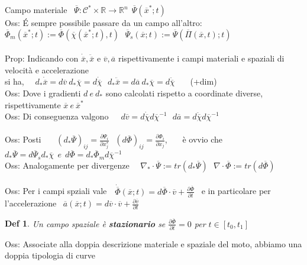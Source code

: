 \documentclass{article}
\theoremstyle{unnumbered}
\newtheorem* {theoremT}{Def}
\theoremstyle{unnumbered1}
\newenvironment{defi}{\begin{gBox}\begin{theoremT}}{\end{theoremT}\end{gBox}}
\begin{document}
Campo materiale \ $\overline{\Psi}:\mathcal{C}^*\times\mathbb{R}\rightarrow\mathbb{R}^n \ \ \overline{\Psi}(\overline{x}^*;t)$\\
%
%
%
Oss: É sempre possibile passare da un campo all'altro:\ \ $\overline{\Phi}_m(\overline{x}^*;t):= \overline{\Phi}(\overline{\chi}(\overline{x}^*;t),t) \ \ \ \overline{\Psi}_s(\overline{x};t):= \overline{\Psi}(\overline{\Pi}(\overline{x},t);t)$\\ \\
%
%
%
Prop: Indicando con $\dot{\overline{x}}, \ddot{\overline{x}}$ e $\overline{v},\overline{a}$ rispettivamente i campi materiali e spaziali di velocità e accelerazione\\
\phantom{Prop: }si ha, \ \ $d_*\dot{\overline{x}}=d\overline{v}\ d_*\overline{\chi}= d\dot{\overline{\chi}} \ \ \ d_*\ddot{\overline{x}}=d\overline{a}\ d_*\overline{\chi}= d\ddot{\overline{\chi}}$ \ \ \ (+dim)\\
%
Oss: Dove i gradienti $d \ e \ d_*$ sono calcolati rispetto a coordinate diverse, rispettivamente $\overline{x} \ e \ \overline{x}^*$ \\
%
Oss: Di conseguenza valgono\ \ \ $d\overline{v}=d\dot{\overline{\chi}}d\overline{\chi}^{-1} \ \ \ d\overline{a}=d\ddot{\overline{\chi}}d\overline{\chi}^{-1}$\\ \\
%
%
%
Oss: Posti \ \ \ $(d_*\overline{\Psi})_{ij}=\frac{\partial \Psi_i}{\partial x^*_j} \ \ \ (d\overline{\Phi})_{ij}=\frac{\partial \Phi_i}{\partial x_j}$, \ \ \ è ovvio che \ $d_*\overline{\Psi}=d\overline{\Psi}_sd_*\overline{\chi} \ \ e \ \ d\overline{\Phi}=d_*\overline{\Phi}_md\overline{\chi}^{-1}$ \\
%
%
Oss: Analogamente per divergenze \ \ $\nabla_*\cdot\overline{\Psi}:=tr(d_*\overline{\Psi}) \ \ \ \nabla\cdot\overline{\Phi}:=tr(d\overline{\Phi}) $\\ \\
%
%
%
Oss: Per i campi spziali vale\ \ $\dot{\overline{\Phi}}(\overline{x};t) = d\overline{\Phi}\cdot\overline{v} + \frac{\partial\overline{\Phi}}{\partial t}$ \ e in particolare per l'accelerazione \ $\overline{a}(\overline{x};t)= d\overline{v}\cdot\overline{v} + \frac{\partial\overline{v}}{\partial t}$\\
%
%
%
\begin{defi}
Un campo spaziale è \textbf{stazionario} se $\frac{\partial \overline{\Phi}}{\partial t}=0$ per $t \in [t_0,t_1]$
\end{defi}
%
Oss: Associate alla doppia descrizione materiale e spaziale del moto, abbiamo una doppia tipologia di curve\\
\end{document}
